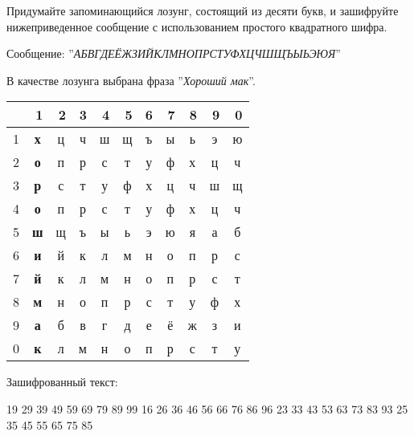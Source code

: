 \begin{problem}
  Придумайте запоминающийся лозунг, состоящий из десяти букв, и зашифруйте
  нижеприведенное сообщение с использованием простого квадратного шифра.

  Сообщение: ''\textit{АБВГДЕЁЖЗИЙКЛМНОПРСТУФХЦЧШЩЪЫЬЭЮЯ}''
\end{problem}

\begin{solution}
  В качестве лозунга выбрана фраза ''\textit{Хороший мак}''.
  
\begin{table}[H]
  \centering
  \begin{tabular}{|r|c|c|c|c|c|c|c|c|c|c|}
  \hline
  \multicolumn{1}{|l|}{ } & \multicolumn{1}{r|}{1} & \multicolumn{1}{r|}{2} & \multicolumn{1}{r|}{3} & \multicolumn{1}{r|}{4} & \multicolumn{1}{r|}{5} & \multicolumn{1}{r|}{6} & \multicolumn{1}{r|}{7} & \multicolumn{1}{r|}{8} & \multicolumn{1}{r|}{9} & \multicolumn{1}{r|}{0} \\ \hline
  1 & \textbf{х} & ц & ч & ш & щ & ъ & ы & ь & э & ю \\ \hline
  2 & \textbf{о} & п & р & с & т & у & ф & х & ц & ч \\ \hline
  3 & \textbf{р} & с & т & у & ф & х & ц & ч & ш & щ \\ \hline
  4 & \textbf{о} & п & р & с & т & у & ф & х & ц & ч \\ \hline
  5 & \textbf{ш} & щ & ъ & ы & ь & э & ю & я & а & б \\ \hline
  6 & \textbf{и} & й & к & л & м & н & о & п & р & с \\ \hline
  7 & \textbf{й} & к & л & м & н & о & п & р & с & т \\ \hline
  8 & \textbf{м} & н & о & п & р & с & т & у & ф & х \\ \hline
  9 & \textbf{а} & б & в & г & д & е & ё & ж & з & и \\ \hline
  0 & \textbf{к} & л & м & н & о & п & р & с & т & у \\ \hline
  \end{tabular}
  \label{}
  \end{table}

  Зашифрованный текст:
  \begin{addmargin}[2cm]{1cm}
    19 29 39 49 59 69 79 89 99 16 26 36 46 56 66 76 86 96 23 33 43 53 63 73 83
    93 25 35 45 55 65 75 85
  \end{addmargin}

\end{solution}
